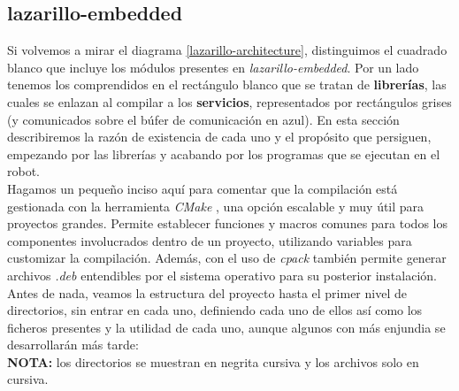 \subsection{lazarillo-embedded}

Si volvemos a mirar el diagrama \ref{lazarillo-architecture}, distinguimos el cuadrado blanco que incluye los módulos presentes en \textit{lazarillo-embedded}. Por un lado tenemos los comprendidos en el rectángulo blanco que se tratan de \textbf{librerías}, las cuales se enlazan al compilar a los \textbf{servicios}, representados por rectángulos grises (y comunicados sobre el búfer de comunicación en azul). En esta sección describiremos la razón de existencia de cada uno y el propósito que persiguen, empezando por las librerías y acabando por los programas que se ejecutan en el robot.\\

Hagamos un pequeño inciso aquí para comentar que la compilación está gestionada con la herramienta \textit{CMake} \cite{cmake}, una opción escalable y muy útil para proyectos grandes. Permite establecer funciones y macros comunes para todos los componentes involucrados dentro de un proyecto, utilizando variables para customizar la compilación. Además, con el uso de \emph{cpack} también permite generar archivos \emph{.deb} entendibles por el sistema operativo para su posterior instalación.\\

Antes de nada, veamos la estructura del proyecto hasta el primer nivel de directorios, sin entrar en cada uno, definiendo cada uno de ellos así como los ficheros presentes y la utilidad de cada uno, aunque algunos con más enjundia se desarrollarán más tarde:\\

\textbf{NOTA:} los directorios se muestran en negrita cursiva y los archivos solo en cursiva.

